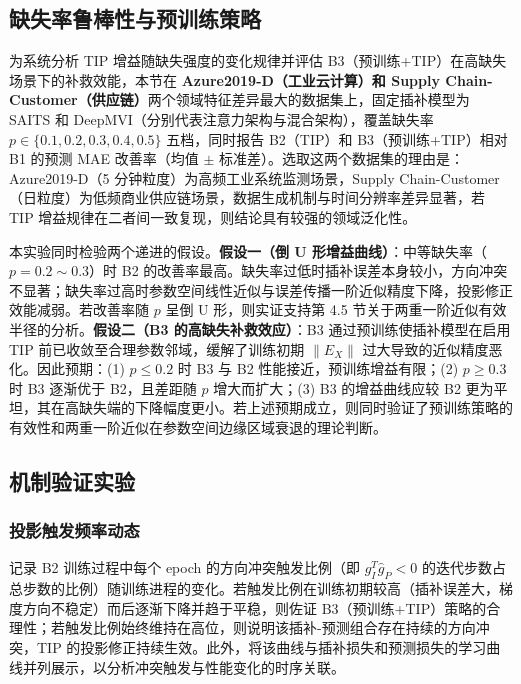 \documentclass{article}
\begin{document}
\FloatBarrier

\subsection{缺失率鲁棒性与预训练策略}\label{sec:missing_robustness}

为系统分析 TIP 增益随缺失强度的变化规律并评估 B3（预训练+TIP）在高缺失场景下的补救效能，本节在 \textbf{Azure2019-D（工业云计算）和 Supply Chain-Customer（供应链）}两个领域特征差异最大的数据集上，固定插补模型为 SAITS 和 DeepMVI（分别代表注意力架构与混合架构），覆盖缺失率 $p \in \{0.1, 0.2, 0.3, 0.4, 0.5\}$ 五档，同时报告 B2（TIP）和 B3（预训练+TIP）相对 B1 的预测 MAE 改善率（均值 $\pm$ 标准差）。选取这两个数据集的理由是：Azure2019-D（5 分钟粒度）为高频工业系统监测场景，Supply Chain-Customer（日粒度）为低频商业供应链场景，数据生成机制与时间分辨率差异显著，若 TIP 增益规律在二者间一致复现，则结论具有较强的领域泛化性。

本实验同时检验两个递进的假设。\textbf{假设一（倒 U 形增益曲线）}：中等缺失率（$p=0.2\sim0.3$）时 B2 的改善率最高。缺失率过低时插补误差本身较小，方向冲突不显著；缺失率过高时参数空间线性近似与误差传播一阶近似精度下降，投影修正效能减弱。若改善率随 $p$ 呈倒 U 形，则实证支持第 4.5 节关于两重一阶近似有效半径的分析。\textbf{假设二（B3 的高缺失补救效应）}：B3 通过预训练使插补模型在启用 TIP 前已收敛至合理参数邻域，缓解了训练初期 $\|E_X\|$ 过大导致的近似精度恶化。因此预期：(1) $p \leq 0.2$ 时 B3 与 B2 性能接近，预训练增益有限；(2) $p \geq 0.3$ 时 B3 逐渐优于 B2，且差距随 $p$ 增大而扩大；(3) B3 的增益曲线应较 B2 更为平坦，其在高缺失端的下降幅度更小。若上述预期成立，则同时验证了预训练策略的有效性和两重一阶近似在参数空间边缘区域衰退的理论判断。

\subsection{机制验证实验}\label{sec:mechanism}

\subsubsection{投影触发频率动态}

记录 B2 训练过程中每个 epoch 的方向冲突触发比例（即 $g_I^T \hat{g}_P < 0$ 的迭代步数占总步数的比例）随训练进程的变化。若触发比例在训练初期较高（插补误差大，梯度方向不稳定）而后逐渐下降并趋于平稳，则佐证 B3（预训练+TIP）策略的合理性；若触发比例始终维持在高位，则说明该插补-预测组合存在持续的方向冲突，TIP 的投影修正持续生效。此外，将该曲线与插补损失和预测损失的学习曲线并列展示，以分析冲突触发与性能变化的时序关联。
\end{document}

